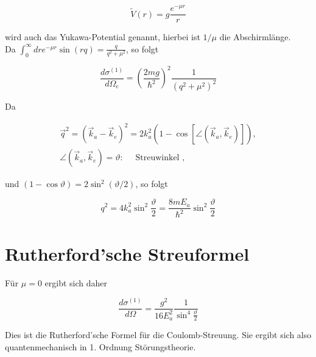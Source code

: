 \documentclass[10pt, letterpaper]{article}
\begin{document}
$$
\tilde{V}(r)=g \frac{e^{-\mu r}}{r}
$$

wird auch das Yukawa-Potential genannt, hierbei ist $1 / \mu$ die Abschirmlänge.\\
Da $\int_{0}^{\infty} d r e^{-\mu r} \sin (r q)=\frac{q}{q^{2}+\mu^{2}}$, so folgt

$$
\frac{d \sigma^{(1)}}{d \Omega_{e}}=\left(\frac{2 m g}{\hbar^{2}}\right)^{2} \frac{1}{\left(q^{2}+\mu^{2}\right)^{2}}
$$

Da

$$
\begin{gathered}
\vec{q}^{2}=\left(\vec{k}_{a}-\vec{k}_{e}\right)^{2}=2 k_{a}^{2}\left(1-\cos \left[\angle\left(\vec{k}_{a}, \vec{k}_{e}\right)\right]\right), \\
\angle\left(\vec{k}_{a}, \vec{k}_{e}\right)=\vartheta: \quad \text { Streuwinkel },
\end{gathered}
$$

und $(1-\cos \vartheta)=2 \sin ^{2}(\vartheta / 2)$, so folgt

$$
q^{2}=4 k_{a}^{2} \sin ^{2} \frac{\vartheta}{2}=\frac{8 m E_{a}}{\hbar^{2}} \sin ^{2} \frac{\vartheta}{2}
$$

\section*{Rutherford'sche Streuformel}
Für $\mu=0$ ergibt sich daher

$$
\frac{d \sigma^{(1)}}{d \Omega}=\frac{g^{2}}{16 E_{a}^{2}} \frac{1}{\sin ^{4} \frac{\vartheta}{2}}
$$

Dies ist die Rutherford'sche Formel für die Coulomb-Streuung. Sie ergibt sich also quantenmechanisch in 1. Ordnung Störungstheorie.
\end{document}
